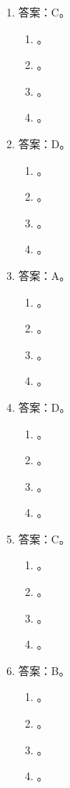 \begin{enumerate}
\item 答案：C。
	\begin{enumerate}[label=\Alph*.]
	\item 。
	\item 。
	\item 。
	\item 。
	\end{enumerate}

\item 答案：D。
	\begin{enumerate}[label=\Alph*.]
	\item 。
	\item 。
	\item 。
	\item 。
	\end{enumerate}

\item 答案：A。
	\begin{enumerate}[label=\Alph*.]
	\item 。
	\item 。
	\item 。
	\item 。
	\end{enumerate}

\item 答案：D。
	\begin{enumerate}[label=\Alph*.]
	\item 。
	\item 。
	\item 。
	\item 。
	\end{enumerate}

\item 答案：C。
	\begin{enumerate}[label=\Alph*.]
	\item 。
	\item 。
	\item 。
	\item 。
	\end{enumerate}

\item 答案：B。
	\begin{enumerate}[label=\Alph*.]
	\item 。
	\item 。
	\item 。
	\item 。
	\end{enumerate}


\end{enumerate}
